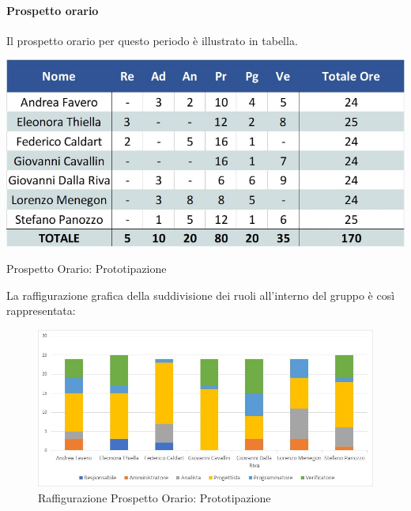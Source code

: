 \paragraph{Prospetto orario}
Il prospetto orario per questo periodo è illustrato in tabella.
\begin{table}[H]
	\centerline{\includegraphics[scale=0.7]{img/Preventivo/PrototipazioneOrario.jpg}}
	\caption{Prospetto Orario: Prototipazione}
	\clearpage
\end{table}
La raffigurazione grafica della suddivisione dei ruoli all'interno del gruppo è così rappresentata: 
\begin{figure}[H]
	\centerline{\includegraphics[scale=0.85]{img/Preventivo/Istogrammi/Prototipazione.jpg}}
	\caption{Raffigurazione Prospetto Orario: Prototipazione}
	\clearpage
\end{figure}
\newpage
